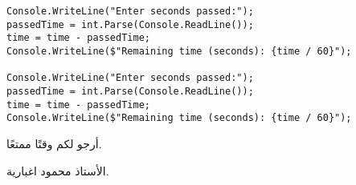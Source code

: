 ﻿\documentclass[12pt]{article}
\begin{document}
\begin{enumerate}
\begin{boxSolution}
\begin{english}
\begin{verbatim}
Console.WriteLine("Enter seconds passed:");
passedTime = int.Parse(Console.ReadLine());
time = time - passedTime;
Console.WriteLine($"Remaining time (seconds): {time / 60}");

Console.WriteLine("Enter seconds passed:");
passedTime = int.Parse(Console.ReadLine());
time = time - passedTime;
Console.WriteLine($"Remaining time (seconds): {time / 60}");
\end{verbatim}
\end{english}
\end{boxSolution}
\fi

\clearpage
\fi



\end{enumerate}

\vspace{3cm}
\begin{flushleft}
أرجو لكم وقتًا ممتعًا.

الأستاذ محمود اغبارية.
\end{flushleft}
\end{document}
